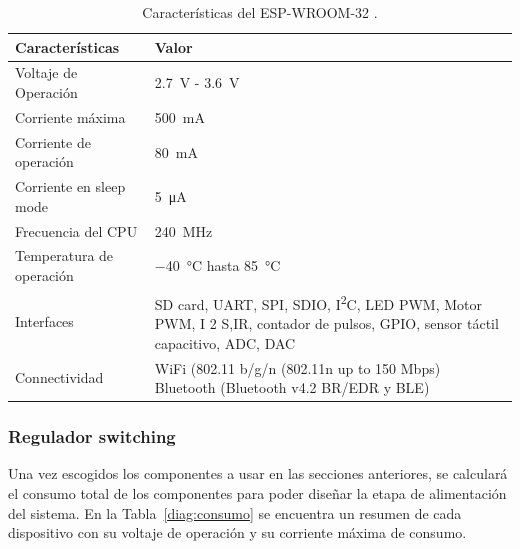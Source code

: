 \bgroup
\def\arraystretch{1.5}%
\begin{table}[htbp!]
\centering
\caption[Características del ESP-WROOM-32]{Características del ESP-WROOM-32 \cite{Esp32_Hardware}.}
\begin{tabular}{@{}lp{9cm}@{}}
\toprule
Características & Valor \\ \midrule
Voltaje de Operación & \SI{2.7}{V} - \SI{3.6}{V} \\
Corriente máxima & \SI{500}{mA} \\
Corriente de operación & \SI{80}{mA} \\
Corriente en sleep mode & \SI{5}{\uA} \\
Frecuencia del CPU & \SI{240}{MHz} \\
Temperatura de operación & \SI{-40}{\celsius} hasta \SI{85}{\celsius} \\
Interfaces & SD card, UART, SPI, SDIO, I\textsuperscript{2}C, LED PWM, Motor PWM, I 2 S,IR, contador de pulsos, GPIO, sensor táctil capacitivo, ADC, DAC \\
Connectividad & WiFi (802.11 b/g/n (802.11n up to 150 Mbps) Bluetooth (Bluetooth v4.2 BR/EDR y BLE)\\\bottomrule
\end{tabular}
\label{diag:ESP32}
\end{table}
\egroup









\subsubsection{Regulador switching}
Una vez escogidos los componentes a usar en las secciones anteriores, se calculará el consumo total de los componentes para poder diseñar la etapa de alimentación del sistema. En la Tabla~\ref{diag:consumo} se encuentra un resumen de cada dispositivo con su voltaje de operación y su corriente máxima de consumo.

